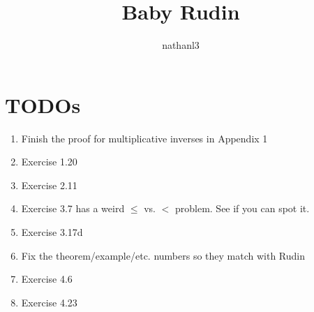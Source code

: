 \documentclass{scrbook}
\title{Baby Rudin}
\author{nathanl3}
\begin{document}
\maketitle

\tableofcontents









\chapter{TODOs}
\begin{enumerate}
\item Finish the proof for multiplicative inverses in Appendix 1
\item Exercise 1.20
\item Exercise 2.11
\item Exercise 3.7 has a weird $\le$ vs. $<$ problem. See if you can spot it.
\item Exercise 3.17d
\item Fix the theorem/example/etc. numbers so they match with Rudin
\item Exercise 4.6
\item Exercise 4.23
\end{enumerate}
\end{document}
